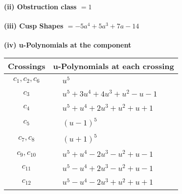 \documentclass[1p]{elsarticle_modified}
\theoremstyle{definition}
\begin{document}
\flushleft \textbf{(ii) Obstruction class $= 1$}\\~\\
\flushleft \textbf{(iii) Cusp Shapes $= -5 a^4+5 a^3+7 a-14$}\\~\\
\newpage\renewcommand{\arraystretch}{1}
\flushleft \textbf{(iv) u-Polynomials at the component}\newline \\
\begin{tabular}{m{50pt}|m{274pt}}
Crossings & \hspace{64pt}u-Polynomials at each crossing \\
\hline $$\begin{aligned}c_{1},c_{2},c_{6}\end{aligned}$$&$\begin{aligned}
&u^5
\end{aligned}$\\
\hline $$\begin{aligned}c_{3}\end{aligned}$$&$\begin{aligned}
&u^5+3 u^4+4 u^3+u^2- u-1
\end{aligned}$\\
\hline $$\begin{aligned}c_{4}\end{aligned}$$&$\begin{aligned}
&u^5+u^4+2 u^3+u^2+u+1
\end{aligned}$\\
\hline $$\begin{aligned}c_{5}\end{aligned}$$&$\begin{aligned}
&(u-1)^5
\end{aligned}$\\
\hline $$\begin{aligned}c_{7},c_{8}\end{aligned}$$&$\begin{aligned}
&(u+1)^5
\end{aligned}$\\
\hline $$\begin{aligned}c_{9},c_{10}\end{aligned}$$&$\begin{aligned}
&u^5+u^4-2 u^3- u^2+u-1
\end{aligned}$\\
\hline $$\begin{aligned}c_{11}\end{aligned}$$&$\begin{aligned}
&u^5- u^4+2 u^3- u^2+u-1
\end{aligned}$\\
\hline $$\begin{aligned}c_{12}\end{aligned}$$&$\begin{aligned}
&u^5- u^4-2 u^3+u^2+u+1
\end{aligned}$\\
\hline
\end{tabular}\\~\\
\end{document}
